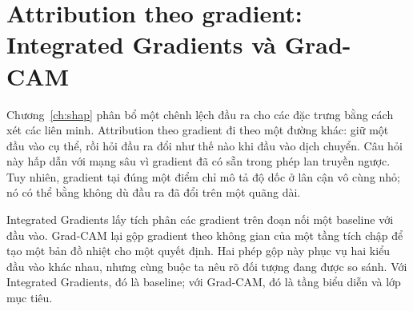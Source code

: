 \chapter{Attribution theo gradient: Integrated Gradients và Grad-CAM}
\label{ch:attribution-theo-gradient}

Chương~\ref{ch:shap} phân bổ một chênh lệch đầu ra cho các đặc trưng bằng
cách xét các liên minh. Attribution theo gradient đi theo một đường khác: giữ
một đầu vào cụ thể, rồi hỏi đầu ra đổi như thế nào khi đầu vào dịch chuyển. Câu
hỏi này hấp dẫn với mạng sâu vì gradient đã có sẵn trong phép lan truyền ngược.
Tuy nhiên, gradient tại đúng một điểm chỉ mô tả độ dốc ở lân cận vô cùng nhỏ;
nó có thể bằng không dù đầu ra đã đổi trên một quãng dài.

Integrated Gradients lấy tích phân các gradient trên đoạn nối một baseline với
đầu vào. Grad-CAM lại gộp gradient theo không gian của một tầng tích chập để
tạo một bản đồ nhiệt cho một quyết định. Hai phép gộp này phục vụ hai kiểu đầu
vào khác nhau, nhưng cùng buộc ta nêu rõ đối tượng đang được so sánh. Với
Integrated Gradients, đó là baseline; với Grad-CAM, đó là tầng biểu diễn và
lớp mục tiêu.









